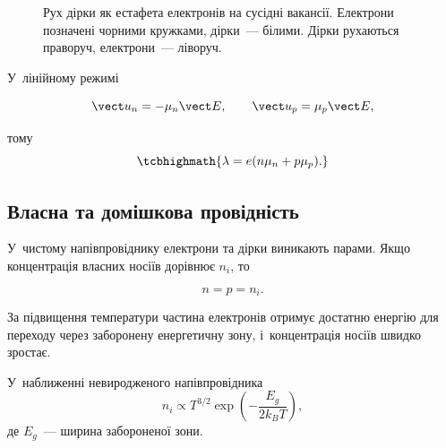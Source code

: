 \begin{figure}[h!]\centering
	\caption{Рух дірки як естафета електронів на сусідні вакансії. Електрони позначені
	чорними кружками, дірки~--- білими. Дірки рухаються праворуч, електрони~---
	ліворуч.\label{pic:HoleMotion}}
\end{figure}

У~лінійному режимі

\begin{equation*}
	\vect u_n=-\mu_n\vect E,
	\qquad
	\vect u_p=\mu_p\vect E,
\end{equation*}

тому
\begin{equation}\label{eq:SemiconductorConductivity}
	\tcbhighmath{
		\lambda=e(n\mu_n+p\mu_p).
	}
\end{equation}


\subsection*{Власна та домішкова провідність}


У~чистому напівпровіднику електрони та дірки виникають парами. Якщо концентрація власних
носіїв дорівнює $n_i$, то

\begin{equation*}
	n=p=n_i.
\end{equation*}

За підвищення температури частина електронів отримує достатню енергію для переходу через
заборонену енергетичну зону, і~концентрація носіїв швидко зростає.

У~наближенні невиродженого напівпровідника
\begin{equation}\label{eq:IntrinsicConcentration}
	n_i\propto T^{3/2}
	\exp\left(-\frac{E_g}{2k_BT}\right),
\end{equation}
де $E_g$~--- ширина забороненої зони.

